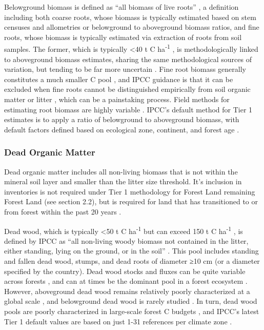 \documentclass[, manuscript]{copernicus}
\begin{document}
Belowground biomass is defined as ``all biomass of live roots''
\citep{ipcc_good_2003, ipcc_2006_2006}, a definition including both
coarse roots, whose biomass is typically estimated based on stem
censuses and allometries or belowground to aboveground biomass ratios,
and fine roots, whose biomass is typically estimated via extraction of
roots from soil samples. The former, which is typically \textless40 t C
ha\textsuperscript{-1} \citep{anderson-teixeira_carbon_2021}, is
methodologically linked to aboveground biomass estimates, sharing the
same methodological sources of variation, but tending to be far more
uncertain \citep{ref}. Fine root biomass generally constitutes a much
smaller C pool \citep[typically \textless5 t C
ha\textsuperscript{-1},][]{anderson-teixeira_carbon_2021}, and IPCC
guidance is that it can be excluded when fine roots cannot be
distinguished empirically from soil organic matter or litter
\citep{ipcc_2006_2006}, which can be a painstaking process. Field
methods for estimating root biomass are highly variable \citep{ref}.
IPCC's default method for Tier 1 estimates is to apply a ratio of
belowground to aboveground biomass, with default factors defined based
on ecological zone, continent, and forest age
\citep{ipcc_2006_2006, ipcc_2019_2019}.

\subsubsection{Dead Organic Matter}

Dead organic matter includes all non-living biomass that is not within
the mineral soil layer and smaller than the litter size threshold. It's
inclusion in inventories is not required under Tier 1 methodology for
Forest Land remaining Forest Land (see section 2.2), but is required for
land that has transitioned to or from forest within the past 20 years
\citep{ipcc_2006_2006}.

Dead wood, which is typically \textless50 t C ha\textsuperscript{-1} but
can exceed 150 t C ha\textsuperscript{-1}
\citep{anderson-teixeira_carbon_2021}, is defined by IPCC as ``all
non-living woody biomass not contained in the litter, either standing,
lying on the ground, or in the soil''
\citep{ipcc_good_2003, ipcc_2006_2006}. This pool includes standing and
fallen dead wood, stumps, and dead roots of diameter ≥10 cm (or a
diameter specified by the country). Dead wood stocks and fluxes can be
quite variable across forests \citep{anderson-teixeira_carbon_2021}, and
can at times be the dominant pool in a forest ecosystem \citep[e.g.,
following a severe natural disturbance,][]{carmona_coarse_2002}.
However, aboveground dead wood remains relatively poorly characterized
at a global scale \citep{anderson-teixeira_carbon_2021}, and belowground
dead wood is rarely studied \citep{merganicova_dadwood_2012}. In turn,
dead wood pools are poorly characterized in large-scale forest C budgets
\citep{pan_large_2011, harris_global_2021}, and IPCC's latest Tier 1
default values are based on just 1-31 references per climate zone
\citep[Table 2.2 in][]{ipcc_2019_2019}.
\end{document}
